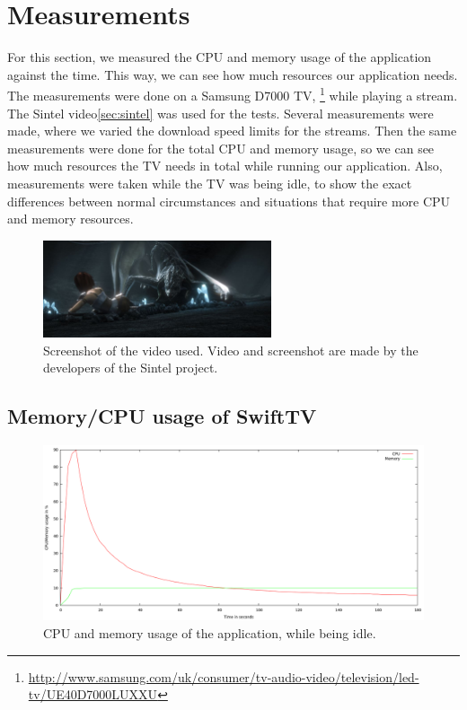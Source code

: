 \section{Measurements}
For this section, we measured the CPU and memory usage of the application against the time.
This way, we can see how much resources our application needs. The measurements were done on a Samsung D7000
TV, \footnote{\url{http://www.samsung.com/uk/consumer/tv-audio-video/television/led-tv/UE40D7000LUXXU}} while playing a stream.
The Sintel video\ref{sec:sintel} was used for the tests. Several measurements were made, where we varied the download speed limits for the streams.
Then the same measurements were done for the total CPU and memory usage, so we can see how much resources the TV needs in total while running
our application. Also, measurements were taken while the TV was being idle, to show the exact differences between normal circumstances and situations
that require more CPU and memory resources.

\begin{center}
\begin{figure}[h!]
	\centering
	\mbox{\includegraphics[width=0.6\textwidth]{Images/sintel.jpg}}
	\caption{Screenshot of the video used. Video and screenshot are made by the developers of the Sintel project.}
	\label{fig:sintel}
\end{figure}
\end{center}

\clearpage

\subsection{Memory/CPU usage of SwiftTV}

\begin{center}
\begin{figure}[h]
	\centering
	\mbox{\includegraphics[width=1.2\textwidth]{Images/idle.png}}
	\caption{CPU and memory usage of the application, while being idle.}
	\label{graph:idle}
\end{figure}
\end{center}

